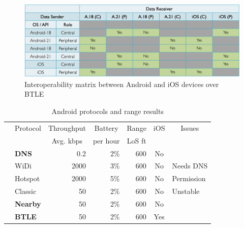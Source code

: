 \documentclass[conference]{IEEEtran}
\begin{document}
\begin{figure}[htbp]
\centerline{\includegraphics[width=\columnwidth]{figs/android_ios}}
\caption{Interoperability matrix between Android and iOS devices over BTLE}
\label{fig:android_ios}
\end{figure}


\begin{table}[H]
\caption{Android protocols and range results}
\centering
\begin{tabular}{|c|l|r|r|r|c|l|}
\hline
& \multicolumn{1}{c|}{Protocol} & \multicolumn{1}{c|}{Throughput} & \multicolumn{1}{c|}{Battery} & \multicolumn{1}{c|}{Range} & \multicolumn{1}{c|}{iOS} & \multicolumn{1}{c|}{Issues}\\
&                               & \multicolumn{1}{c|}{Avg. kbps}  & \multicolumn{1}{c|}{per hour} & \multicolumn{1}{c|}{LoS ft} &                  &                            \\
\hline
\parbox[t]{2mm}{} & \textbf{DNS} & 0.2 & 2\% & 600 & No & \\
& WiDi & 2000 & 3\% & 600 & No & Needs DNS\\
& Hotspot & 2000 & 5\% & 600 & No & Permission\\
\hline
\parbox[t]{2mm}{} & Classic & 50 & 2\% & 600 & No & Unstable\\
& \textbf{Nearby} & 50 & 2\% & 600 & No & \\
& \textbf{BTLE} & 50 & 2\% & 600 & Yes & \\
\hline
\end{tabular}
\end{table}
\end{document}
